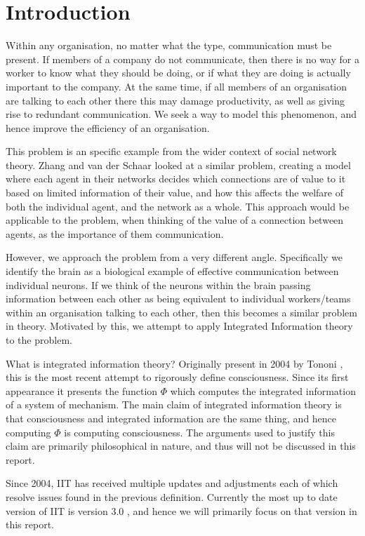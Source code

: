 


\section{Introduction}
Within any organisation, no matter what the type, communication must be present. If members of a company do not communicate, then there is no way for a worker to know what they should be doing, or if what they are doing is actually important to the company. At the same time, if all members of an organisation are talking to each other there this may damage productivity, as well as giving rise to redundant communication. We seek a way to model this phenomenon, and hence improve the efficiency of an organisation.

This problem is an specific example from the wider context of social network theory. Zhang and van der Schaar \cite{zhang2015reputational} looked at a similar problem,  creating a model where each agent in their networks decides which connections are of value to it based on limited information of their value, and how this affects the welfare of both the individual agent, and the network as a whole. This approach would be applicable to the problem, when thinking of the value of a connection between agents, as the importance of them communication.

However, we approach the problem from a very different angle. Specifically we identify the brain as a biological example of effective communication between individual neurons. If we think of the neurons within the brain passing information between each other as being equivalent to individual workers/teams within an organisation talking to each other, then this becomes a similar problem in theory. Motivated by this, we attempt to apply Integrated Information theory to the problem.

What is integrated information theory? Originally present in 2004 by Tononi \cite{tononi2004information}, this is the most recent attempt to rigorously define consciousness. Since its first appearance it presents the function $\Phi$ which computes the integrated information of a system of mechanism. The main claim of integrated information theory is that consciousness and integrated information are the same thing, and hence computing $\Phi$ is computing consciousness. The arguments used to justify this claim are primarily philosophical in nature, and thus will not be discussed in this report. 

Since 2004, IIT has received multiple updates and adjustments \cite{tononi2011integrated,balduzzi2008integrated,tononi2016consciousness} each of which resolve issues found in the previous definition. Currently the most up to date version of IIT is version 3.0 \cite{oizumi2014phenomenology}, and hence we will primarily focus on that version in this report.

